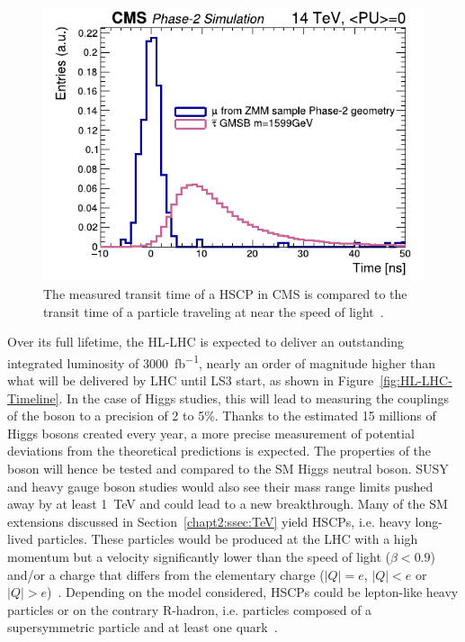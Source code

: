 \begingroup\setlength{\intextsep}{5pt}\setlength{\columnsep}{15pt}
	
	\begin{figure}
		\centering
		\includegraphics[width=\linewidth]{fig/chapt3/HSCP_Time_measurement.pdf}
		\caption{\label{fig:HSCP-Time} The measured transit time of a HSCP in CMS is compared to the transit time of a particle traveling at near the speed of light~\cite{PHASEIITP}.}
	\end{figure}
	
	Over its full lifetime, the HL-LHC is expected to deliver an outstanding integrated luminosity of \SI{3000}{fb^{-1}}, nearly an order of magnitude higher than what will be delivered by LHC until LS3 start, as shown in Figure~\ref{fig:HL-LHC-Timeline}. In the case of Higgs studies, this will lead to measuring the couplings of the boson to a precision of 2 to 5\%. Thanks to the estimated 15 millions of Higgs bosons created every year, a more precise measurement of potential deviations from the theoretical predictions is expected. The properties of the boson will hence be tested and compared to the SM Higgs neutral boson. SUSY and heavy gauge boson studies would also see their mass range limits pushed away by at least \SI{1}{TeV} and could lead to a new breakthrough. Many of the \acl{SM} extensions discussed in Section~\ref{chapt2:ssec:TeV} yield \acf{HSCPs}, i.e. heavy long-lived particles. These particles would be produced at the LHC with a high momentum but a velocity significantly lower than the speed of light ($\beta < 0.9$)~\cite{DREES1990,FAIRBAIRN2007,LIGETI2010,CMSHSCP2016,KHACHATRYAN2017} and/or a charge that differs from the elementary charge ($\vert Q \vert = e$, $\vert Q \vert < e$ or $\vert Q \vert > e$)~\cite{CMSHSCP2016,KHACHATRYAN2017,KUSENKO1998,KOCH2007,SCHWINGER1966,KHLOPOV2006}. Depending on the model considered, HSCPs could be lepton-like heavy particles or on the contrary R-hadron, i.e. particles composed of a supersymmetric particle and at least one quark~\cite{CMSHSCP2016}.
	
